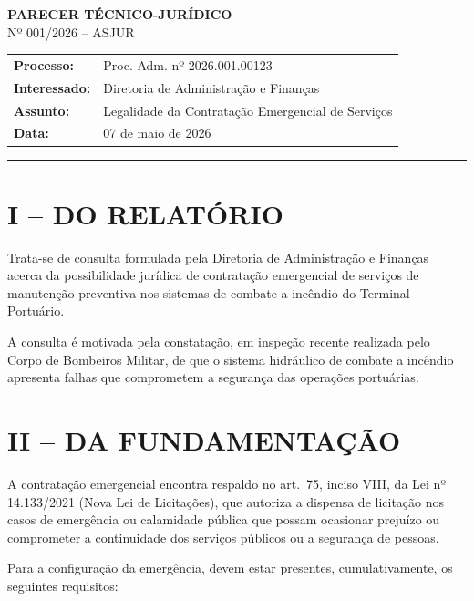 \documentclass[12pt,a4paper]{article}
\begin{document}
\onehalfspacing

\begin{center}
  \vspace*{1cm}
  {\LARGE \textbf{PARECER TÉCNICO-JURÍDICO}}\\[0.5cm]
  {\large Nº 001/2026 -- ASJUR}\\[1cm]
\end{center}

\begin{tabular}{@{}ll@{}}
  \textbf{Processo:} & Proc. Adm. nº 2026.001.00123 \\
  \textbf{Interessado:} & Diretoria de Administração e Finanças \\
  \textbf{Assunto:} & Legalidade da Contratação Emergencial de Serviços \\
  \textbf{Data:} & 07 de maio de 2026 \\
\end{tabular}

\vspace{1cm}
\hrule
\vspace{0.5cm}

\section*{I -- DO RELATÓRIO}

Trata-se de consulta formulada pela Diretoria de Administração e Finanças acerca da possibilidade jurídica de contratação emergencial de serviços de manutenção preventiva nos sistemas de combate a incêndio do Terminal Portuário.

A consulta é motivada pela constatação, em inspeção recente realizada pelo Corpo de Bombeiros Militar, de que o sistema hidráulico de combate a incêndio apresenta falhas que comprometem a segurança das operações portuárias.

\section*{II -- DA FUNDAMENTAÇÃO}

A contratação emergencial encontra respaldo no art.\ 75, inciso VIII, da Lei nº 14.133/2021 (Nova Lei de Licitações), que autoriza a dispensa de licitação nos casos de emergência ou calamidade pública que possam ocasionar prejuízo ou comprometer a continuidade dos serviços públicos ou a segurança de pessoas.

Para a configuração da emergência, devem estar presentes, cumulativamente, os seguintes requisitos:
\end{document}
